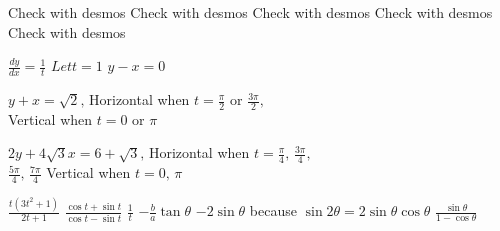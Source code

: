 \begin{Answer}[ref={exParametric}]
\Question %
\begin{tasks}
	\task Check with desmos
	\task Check with desmos
	\task Check with desmos
	\task Check with desmos
	\task Check with desmos
\end{tasks}

\Question %
\begin{tasks}
	\task $\frac{d y}{d x} =\frac{1}{t}$
	\task $ Let t =1$
	\task $y -x =0$
\end{tasks}

\Question %
$y +x =\sqrt{2}\text{,}$ Horizontal when $t =\frac{\pi }{2}$ or $\frac{3 \pi }{2}\text{,}$\\ Vertical when $t =0$ or $\pi $ 

\Question %
$2 y +4 \sqrt{3} x =6 +\sqrt{3}\text{,}$ Horizontal when $t =\frac{\pi }{4}\text{,}$ $\frac{3 \pi }{4}\text{,}$\\
 $\frac{5 \pi }{4}\text{,}$ $\frac{7 \pi }{4}$ Vertical when $t =0\text{,}$ $\pi $

\Question %
\begin{tasks}
	\task $\frac{t \left (3 t^{2} +1\right )}{2 t +1}$ 
	\task $\frac{\cos  t +\sin  t}{\cos  t -\sin  t}$
	\task $\frac{1}{t}$ 
	\task $ -\frac{b}{a} \tan  \theta $ 
	\task $ -2 \sin  \theta $ because $\sin  2 \theta  =2 \sin  \theta  \cos  \theta $ 
	\task $\frac{\sin  \theta }{1 -\cos  \theta }$ 
\end{tasks}	
\end{Answer}%


